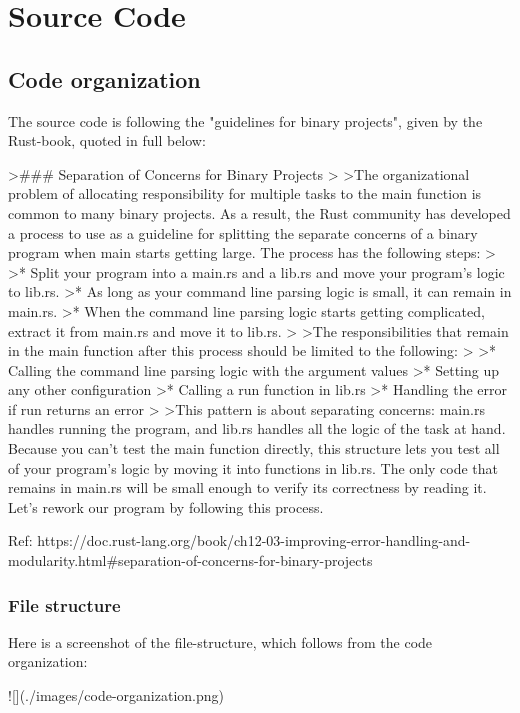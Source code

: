 \chapter{Source Code}

\section{Code organization}

The source code is following the "guidelines for binary projects", given by the Rust-book, quoted in full below:

>### Separation of Concerns for Binary Projects
>
>The organizational problem of allocating responsibility for multiple tasks to the main function is common to many binary projects. As a result, the Rust community has developed a process to use as a guideline for splitting the separate concerns of a binary program when main starts getting large. The process has the following steps:
>
>* Split your program into a main.rs and a lib.rs and move your program’s logic to lib.rs.
>* As long as your command line parsing logic is small, it can remain in main.rs.
>* When the command line parsing logic starts getting complicated, extract it from main.rs and move it to lib.rs.
>
>The responsibilities that remain in the main function after this process should be limited to the following:
>
>* Calling the command line parsing logic with the argument values
>* Setting up any other configuration
>* Calling a run function in lib.rs
>* Handling the error if run returns an error
>
>This pattern is about separating concerns: main.rs handles running the program, and lib.rs handles all the logic of the task at hand. Because you can’t test the main function directly, this structure lets you test all of your program’s logic by moving it into functions in lib.rs. The only code that remains in main.rs will be small enough to verify its correctness by reading it. Let’s rework our program by following this process.

Ref: https://doc.rust-lang.org/book/ch12-03-improving-error-handling-and-modularity.html#separation-of-concerns-for-binary-projects


\subsection{File structure}

Here is a screenshot of the file-structure, which follows from the code organization:

![](./images/code-organization.png)



